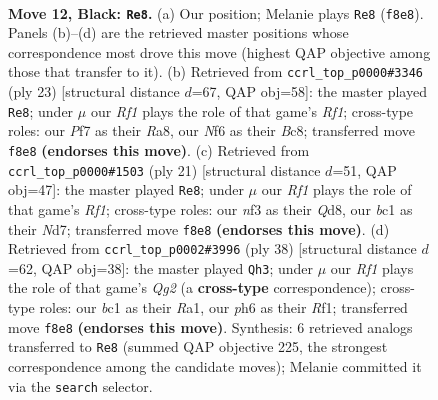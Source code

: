 \documentclass[11pt]{article}
\begin{document}
\clearpage

\begin{figure}[p]\centering
\begin{subfigure}{0.46\textwidth}\centering
\resizebox{\linewidth}{!}{%
\newchessgame
\chessboard[
  setfen={1rbq1rk1/p1p2ppp/2pp1n1P/4p3/P3P3/2PP1N2/2P2PP1/R1BQ1RK1 b - - 0 12},
  showmover=false,
  pgfstyle=straightmove, color=movearrow, markmove={f8-e8}
]}
\caption{}
\end{subfigure}\hfill
\begin{subfigure}{0.46\textwidth}\centering
\resizebox{\linewidth}{!}{%
\newchessgame
\chessboard[
  setfen={r1bq1rk1/1pp2ppp/p4n2/2PpN3/4P3/2PP3P/P2B1PP1/R2Q1RK1 b - - 0 12},
  showmover=false,
  pgfstyle=straightmove, color=movearrow, markmove={f8-e8}
]}
\caption{}
\end{subfigure}
\\[4pt]
\begin{subfigure}{0.46\textwidth}\centering
\resizebox{\linewidth}{!}{%
\newchessgame
\chessboard[
  setfen={r1bq1rk1/2pn1ppp/p1pp4/4p3/P2PP3/2P2N1P/2P2PP1/R1BQR1K1 b - - 0 11},
  showmover=false,
  pgfstyle=straightmove, color=movearrow, markmove={f8-e8}
]}
\caption{}
\end{subfigure}\hfill
\begin{subfigure}{0.46\textwidth}\centering
\resizebox{\linewidth}{!}{%
\newchessgame
\chessboard[
  setfen={1r5r/1pqkbp2/p3pn1p/2p1p3/2P1P1P1/2NPB3/PP4QP/R4R1K w - - 2 20},
  showmover=false,
  pgfstyle=straightmove, color=movearrow, markmove={g2-h3}
]}
\caption{}
\end{subfigure}
\caption{\textbf{Move 12, Black: \texttt{Re8}.} (a) Our position; Melanie plays \texttt{Re8} (\texttt{f8e8}). Panels (b)--(d) are the retrieved master positions whose correspondence most drove this move (highest QAP objective among those that transfer to it). (b) Retrieved from \texttt{ccrl\_top\_p0000\#3346} (ply 23) [structural distance $d$=67, QAP obj=58]: the master played \texttt{Re8}; under $\mu$ our \emph{Rf1} plays the role of that game's \emph{Rf1}; cross-type roles: our \emph{P}f7 as their \emph{R}a8, our \emph{N}f6 as their \emph{B}c8; transferred move \texttt{f8e8} \textbf{(endorses this move)}. (c) Retrieved from \texttt{ccrl\_top\_p0000\#1503} (ply 21) [structural distance $d$=51, QAP obj=47]: the master played \texttt{Re8}; under $\mu$ our \emph{Rf1} plays the role of that game's \emph{Rf1}; cross-type roles: our \emph{n}f3 as their \emph{Q}d8, our \emph{b}c1 as their \emph{N}d7; transferred move \texttt{f8e8} \textbf{(endorses this move)}. (d) Retrieved from \texttt{ccrl\_top\_p0002\#3996} (ply 38) [structural distance $d$=62, QAP obj=38]: the master played \texttt{Qh3}; under $\mu$ our \emph{Rf1} plays the role of that game's \emph{Qg2} (a \textbf{cross-type} correspondence); cross-type roles: our \emph{b}c1 as their \emph{R}a1, our \emph{p}h6 as their \emph{R}f1; transferred move \texttt{f8e8} \textbf{(endorses this move)}. Synthesis: 6 retrieved analogs transferred to \texttt{Re8} (summed QAP objective 225, the strongest correspondence among the candidate moves); Melanie committed it via the \texttt{search} selector.}
\label{fig:thought-m23}
\end{figure}
\end{document}
